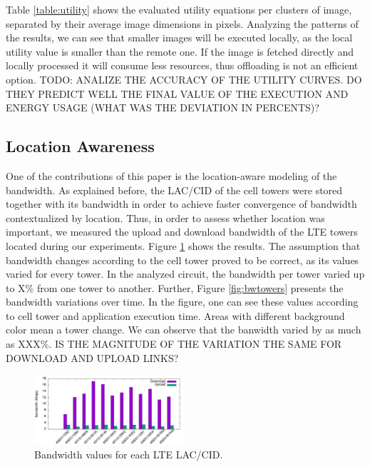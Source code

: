 \documentclass[10pt, conference, letterpaper]{IEEEtran}
\begin{document}
  Table \ref{table:utility} shows the evaluated utility equations per clusters of image, separated by their average image dimensions in pixels. Analyzing the patterns of the results, we can see that smaller images will be executed locally, as the local utility value is smaller than the remote one. If the image is fetched directly and locally processed it will consume less resources, thus offloading is not an efficient option. {\color{red} TODO: ANALIZE THE ACCURACY OF THE UTILITY CURVES. DO THEY PREDICT WELL THE FINAL VALUE OF THE EXECUTION AND ENERGY USAGE (WHAT WAS THE DEVIATION IN PERCENTS)? }

\subsection{Location Awareness}

One of the contributions of this paper is the location-aware modeling of the bandwidth. As explained before, the LAC/CID of the cell towers were stored together with its bandwidth in order to achieve faster convergence of bandwidth contextualized by location. Thus, in order to assess whether location was important, we measured the upload and download bandwidth of the LTE towers located during our experiments.  Figure \ref{fig:bwtime} shows the results. The assumption that bandwidth changes according to the cell tower proved to be correct, as its values varied for every tower. {\color{red} In the analyzed circuit, the bandwidth per tower varied up to X\% from one tower to another.} Further, Figure \ref{fig:bwtowers} presents the bandwidth variations over time. In  the figure, one can see these values according to cell tower and application execution time. Areas with different background color mean a tower change. {\color{red}We can observe that the banwidth varied by as much as XXX\%. IS THE MAGNITUDE OF THE VARIATION THE SAME FOR DOWNLOAD AND UPLOAD LINKS?}

\begin{figure}[b]
  \centering
  \includegraphics[width=0.5\textwidth]{results/plots/laccid-bw/bars.png}
  \caption{Bandwidth values for each LTE LAC/CID.}
  \label{fig:bwtime}
\end{figure}
\end{document}
